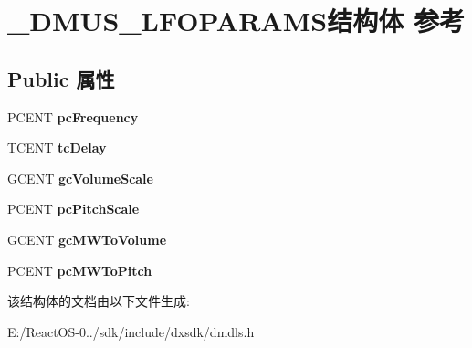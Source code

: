 \hypertarget{struct___d_m_u_s___l_f_o_p_a_r_a_m_s}{}\section{\+\_\+\+D\+M\+U\+S\+\_\+\+L\+F\+O\+P\+A\+R\+A\+M\+S结构体 参考}
\label{struct___d_m_u_s___l_f_o_p_a_r_a_m_s}
\subsection*{Public 属性}
\begin{DoxyCompactItemize}
\item 
\mbox{\label{struct___d_m_u_s___l_f_o_p_a_r_a_m_s_aff881e9cf176030812af51a5db6b0ad5}} 
P\+C\+E\+NT {\bfseries pc\+Frequency}
\item 
\mbox{\label{struct___d_m_u_s___l_f_o_p_a_r_a_m_s_a5839cb2d2ee959661050ecb267af7486}} 
T\+C\+E\+NT {\bfseries tc\+Delay}
\item 
\mbox{\label{struct___d_m_u_s___l_f_o_p_a_r_a_m_s_a0257a72ca884e127753002ce4fd7a6b3}} 
G\+C\+E\+NT {\bfseries gc\+Volume\+Scale}
\item 
\mbox{\label{struct___d_m_u_s___l_f_o_p_a_r_a_m_s_a1c934344de7b069e28652fa65160ce54}} 
P\+C\+E\+NT {\bfseries pc\+Pitch\+Scale}
\item 
\mbox{\label{struct___d_m_u_s___l_f_o_p_a_r_a_m_s_af3e7a9f5e0dbf849bd20c45625bf0fd3}} 
G\+C\+E\+NT {\bfseries gc\+M\+W\+To\+Volume}
\item 
\mbox{\label{struct___d_m_u_s___l_f_o_p_a_r_a_m_s_a36417fa64a1cd829c7fd40bb22345fce}} 
P\+C\+E\+NT {\bfseries pc\+M\+W\+To\+Pitch}
\end{DoxyCompactItemize}


该结构体的文档由以下文件生成\+:\begin{DoxyCompactItemize}
\item 
E\+:/\+React\+O\+S-\/0../sdk/include/dxsdk/dmdls.\+h\end{DoxyCompactItemize}
